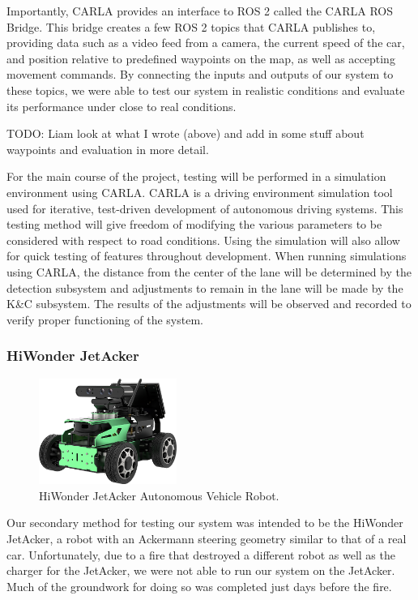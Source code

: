 \documentclass[titlepage,draft]{article}
\begin{document}
{Importantly, CARLA provides an interface to ROS 2 called the CARLA ROS Bridge. This bridge creates a few ROS 2 topics that CARLA publishes to, providing data such as a video feed from a camera, the current speed of the car, and position relative to predefined waypoints on the map, as well as accepting movement commands. By connecting the inputs and outputs of our system to these topics, we were able to test our system in realistic conditions and evaluate its performance under close to real conditions.

TODO: Liam look at what I wrote (above) and add in some stuff about waypoints and evaluation in more detail.

For the main course of the project, testing will be performed in a simulation environment using CARLA. CARLA is a driving environment simulation tool used for iterative, test-driven development of autonomous driving systems.\cite{dosovitskiy2017carla} This testing method will give freedom of modifying the various parameters to be considered with respect to road conditions. Using the simulation will also allow for quick testing of features throughout development. When running simulations using CARLA, the distance from the center of the lane will be determined by the detection subsystem and adjustments to remain in the lane will be made by the K\&C subsystem. The results of the adjustments will be observed and recorded to verify proper functioning of the system.

\subsubsection{HiWonder JetAcker}

\begin{figure}
	\centering
	\includegraphics*[width=0.4\textwidth]{JetAcker1}
	\caption{HiWonder JetAcker Autonomous Vehicle Robot.}
	\label{fig:JetAcker}
\end{figure}

Our secondary method for testing our system was intended to be the HiWonder JetAcker, a robot with an Ackermann steering geometry similar to that of a real car. Unfortunately, due to a fire that destroyed a different robot as well as the charger for the JetAcker, we were not able to run our system on the JetAcker. Much of the groundwork for doing so was completed just days before the fire.

}
\end{document}
